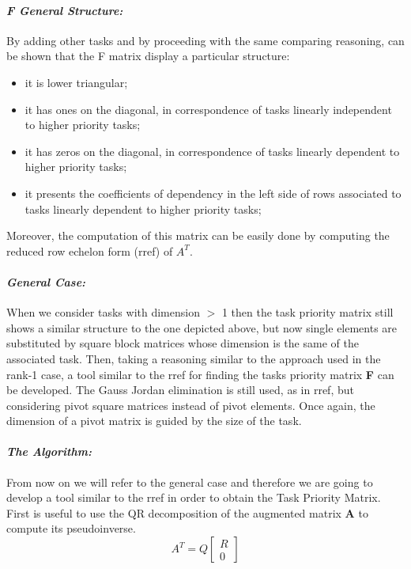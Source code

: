 \documentclass[12pt, a4paper]{article}
\begin{document}
\paragraph{\textit{F General Structure:}}

By adding other tasks and by proceeding with the same comparing reasoning, can be shown that the F matrix display a particular structure:
\begin{itemize}
\item it is lower triangular;
\item it has ones on the diagonal, in correspondence of tasks linearly independent to higher priority tasks;
\item it has zeros on the diagonal, in correspondence of tasks linearly dependent to higher priority tasks;
\item it presents the coefficients of dependency in the left side of rows associated to tasks linearly dependent to higher priority tasks;
\end{itemize}
Moreover, the computation of this matrix can be easily done by computing the reduced row echelon form (rref) of $A^T$.
\paragraph{\textit{General Case:}}

When we consider tasks with dimension $>$ 1 then the task priority matrix still shows a similar structure to the one depicted above, but now single elements are substituted by square block matrices whose dimension is the same of the associated task. Then, taking a reasoning similar to the approach used in the rank-1 case, a tool similar to the rref for finding the tasks priority matrix \textbf{F} can be developed. The Gauss Jordan elimination is still used, as in rref, but considering pivot square matrices instead of pivot elements. Once again, the dimension of a pivot matrix is guided by the size of
the task.

\paragraph{\textit{The Algorithm:}} 

From now on we will refer to the general case and therefore we are going to develop a tool similar to the rref in order to obtain the Task Priority Matrix.
First is useful to use the QR decomposition of the augmented matrix \textbf{A} to compute its pseudoinverse.
\[
A^T = Q\begin{bmatrix}
R\\0
\end{bmatrix}
\]
\end{document}
